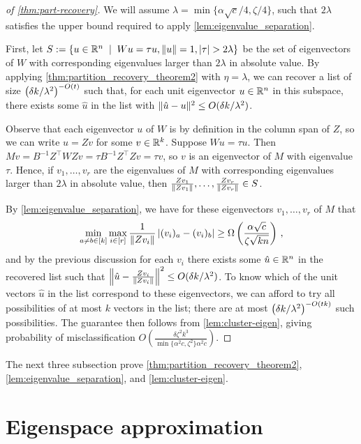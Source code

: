 \begin{proof}[of \cref{thm:part-recovery}]
We will assume $\lambda = \min\{\alpha \sqrt{c} / 4, \zeta/4\}$, such that $2\lambda$ satisfies the upper bound required to apply \cref{lem:eigenvalue_separation}.

First, let $S:=\left\{u \in {\mathbb R}^n\; \mid\; W u = \tau u, \left\lVert u\right\rVert=1, \left\lvert\tau\right\rvert> 2\lambda\right\}$ be the set of eigenvectors of $W$ with corresponding eigenvalues larger than $2\lambda$ in absolute value.
By applying \cref{thm:partition_recovery_theorem2} with $\eta = \lambda$, we can recover a list of size $\left(\delta k/\lambda^2\right)^{-O(t)}$ such that, for each unit eigenvector $u \in {\mathbb R}^n$ in this subspace, there exists some $\hat{u}$ in the list with $\lVert\hat{u}-u\rVert^2 \leq O(\delta k/\lambda^2)$.

Observe that each eigenvector $u$ of $W$ is by definition in the column span of $Z$, so we can write $u = Z v$ for some $v \in {\mathbb R}^{k}$.
Suppose $Wu = \tau u$.
Then $M v = B^{-1} Z^\top W Z v = \tau B^{-1} Z^\top Z v = \tau v$, so $v$ is an eigenvector of $M$ with eigenvalue $\tau$.
Hence, if $v_1, \ldots, v_r$ are the eigenvalues of $M$ with corresponding eigenvalues larger than $2\lambda$ in absolute value, then $\frac{Z v_1}{\left\lVert Zv_1\right\rVert}, \ldots, \frac{Z v_r}{\left\lVert Zv_r\right\rVert} \in S$.

By \cref{lem:eigenvalue_separation}, we have for these eigenvectors $v_1, \ldots, v_r$ of $M$ that 
\[\min_{a\neq b\in[k]}\max_{i \in [r]} \frac{1}{\left\lVert Z v_i\right\rVert} \left\lvert(v_i)_a- (v_i)_b\right\rvert \geq \Omega\left(\frac{\alpha \sqrt{c}}{\zeta \sqrt{k n}}\right)\,,\]
and by the previous discussion for each $v_i$ there exists some $\hat{u} \in {\mathbb R}^n$ in the recovered list such that $\left\lVert\hat{u} - \frac{Z v_i}{\left\lVert Zv_i\right\rVert}\right\rVert^2 \leq O(\delta k / \lambda^2)$.
To know which of the unit vectors $\hat{u}$ in the list correspond to these eigenvectors, we can afford to try all possibilities of at most $k$ vectors in the list; there are at most $\left(\delta k/\lambda^2\right)^{-O(tk)}$ such possibilities.
The guarantee then follows from \cref{lem:cluster-eigen}, giving probability of misclassification $O(\frac{\delta \zeta^2 k^3}{\min\{\alpha^2 c, \zeta^2\} \alpha^2 c} )$.
\end{proof}

The next three subsection prove \cref{thm:partition_recovery_theorem2}, \cref{lem:eigenvalue_separation}, and \cref{lem:cluster-eigen}.

\section{Eigenspace approximation}

